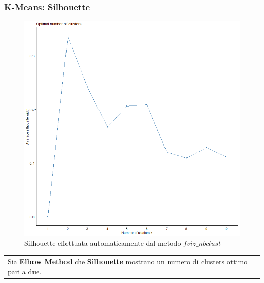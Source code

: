 \begin{frame}[fragile]
\frametitle{K-Means: Silhouette}
\begin{minipage}{0.45\textwidth}
\begin{figure}[H]
        \centering
     \includegraphics[width=0.7\linewidth]{Img/KMEANS004.png}
     \caption{Silhouette effettuata automaticamente dal metodo $fviz\_nbclust$}\label{fig:Silhouette2}
\end{figure}
\end{minipage}%
\hspace{2em}
\begin{minipage}{0.45\textwidth}
\begin{tabular}{|p{\textwidth}}
Sia \textbf{Elbow Method} che \textbf{Silhouette} mostrano un numero di clusters ottimo pari a due.
\end{tabular}
\end{minipage}%
\end{frame}
